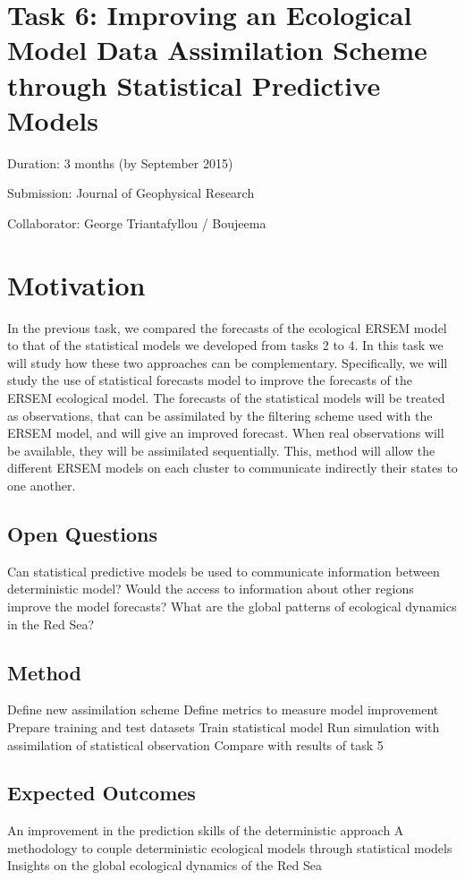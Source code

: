 \section{Task 6: Improving an Ecological Model Data Assimilation Scheme through Statistical Predictive Models}

Duration: 3 months (by September 2015)

Submission: Journal of Geophysical Research 

Collaborator: George Triantafyllou / Boujeema

\section{Motivation}

In the previous task, we compared the forecasts of the ecological ERSEM model to that of the statistical models we developed from tasks 2 to 4. In this task we will study how these two approaches can be complementary. Specifically, we will study the use of statistical forecasts model to improve the forecasts of the ERSEM ecological model. The forecasts of the statistical models will be treated as observations, that can be assimilated by the filtering scheme used with the ERSEM model, and will give an improved forecast. When real observations will be available, they will be assimilated sequentially. This, method will allow the different ERSEM models on each cluster to communicate indirectly their states to one another. 

\subsection{Open Questions}

Can statistical predictive models be used to communicate information between deterministic model?
Would the access to information about other regions improve the model forecasts?
What are the global patterns of ecological dynamics in the Red Sea?

\subsection{Method}

Define new assimilation scheme
Define metrics to measure model improvement
Prepare training and test datasets
Train statistical model
Run simulation with assimilation of statistical observation
Compare with results of task 5

\subsection{Expected Outcomes}

An improvement in the prediction skills of the deterministic approach
A methodology to couple deterministic ecological models through statistical models
Insights on the global ecological dynamics of the Red Sea

